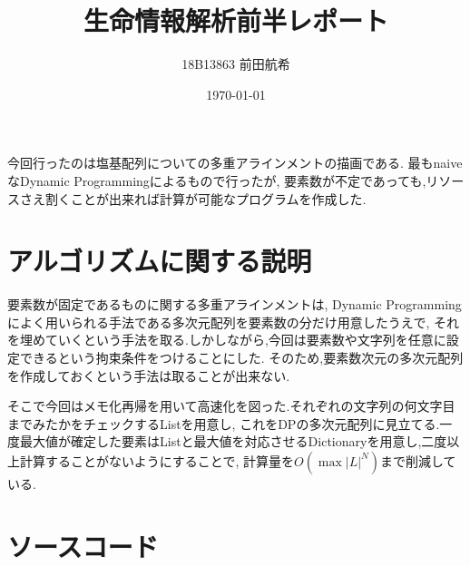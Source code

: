 \documentclass[uplatex,11pt,a4j]{jarticle}
\title{\vspace{-10mm}生命情報解析前半レポート}
\author {18B13863 前田航希}
\date {\today}
\begin{document}
\maketitle

今回行ったのは塩基配列についての多重アラインメントの描画である.
最もnaiveなDynamic Programmingによるもので行ったが,
要素数が不定であっても,リソースさえ割くことが出来れば計算が可能なプログラムを作成した.

\section{アルゴリズムに関する説明}
要素数が固定であるものに関する多重アラインメントは,
Dynamic Programmingによく用いられる手法である多次元配列を要素数の分だけ用意したうえで,
それを埋めていくという手法を取る.しかしながら,今回は要素数や文字列を任意に設定できるという拘束条件をつけることにした.
そのため,要素数次元の多次元配列を作成しておくという手法は取ることが出来ない.

そこで今回はメモ化再帰を用いて高速化を図った.それぞれの文字列の何文字目までみたかをチェックするListを用意し,
これをDPの多次元配列に見立てる.一度最大値が確定した要素はListと最大値を対応させるDictionaryを用意し,二度以上計算することがないようにすることで,
計算量を$O(\max|L|^N)$まで削減している.


\section{ソースコード}



\end{document}
